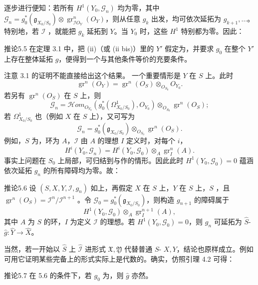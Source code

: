 逐步进行便知：若所有 $H^1(Y_0,\mathcal G_n)$ 均为零，其中 $\mathcal G_n=g_0^*(\mathfrak g_{X_0/S_0})\otimes\operatorname{gr}^n_{\mathcal I O_Y}(O_Y)$，则从任意 $g_k$ 出发，均可依次延拓为 $g_{k+1},\ldots$。特别地，若 $\mathcal I$ ，就能把 $g_k$ 延拓到 $Y$。当 $Y_0$ 时，这些 $H^1$ 特别都为零。因此：
\begin{SGAresult}{推论}{5.5}
在定理 3.1 中，把 (ii)（或 (ii bis)）里的 $Y'$ 假定为，并要求 $g_0$ 在整个 $Y'$ 上存在整体延拓 $g$，便得到一个与其他条件等价的充要条件。
\end{SGAresult}
注意 3.1 的证明不能直接给出这个结果。
一个重要情形是 $Y$ 在 $S$ 上。此时
\[\operatorname{gr}^n(O_Y)=\operatorname{gr}^n(O_S)\otimes_{O_{S_0}}O_{Y_0}.\]
若另有 $\operatorname{gr}^n(O_S)$ 在 $S$ 上，则
\[\mathcal G_n=\mathcal H\!om_{O_{Y_0}}(g_0^*(\Omega^1_{X_0/S_0}),O_{Y_0})\otimes_{O_{S_0}}\operatorname{gr}^n(O_S);\]
若 $\Omega^1_{X_0/S_0}$ 也（例如 $X$ 在 $S$ 上），又可写为
\[\mathcal G_n=g_0^*(\mathfrak g_{X_0/S_0})\otimes_{O_{S_0}}\operatorname{gr}^n(O_S).\]
例如，$S$ 为，环为 $A$，$\mathcal I$ 由 $A$ 的理想 $I$ 定义时，对每个 $i$，
\[H^i(Y_0,\mathcal G_n)=H^i(Y_0,\mathcal G_0)\otimes_A\operatorname{gr}^n_I(A).\]
事实上问题在 $S_0$ 上局部，可归结到与作的情形。因此此时 $H^1(Y_0,\mathcal G_0)=0$ 蕴涵依次延拓 $g_n$ 的所有障碍均为零。故：
\begin{SGAresult}{推论}{5.6}
设 $(S,X,Y,\mathcal I,g_n)$ 如上，再假定 $X$ 在 $S$ 上，$Y$ 在 $S$ 上，$S$ ，且 $\operatorname{gr}^n(O_S)=\mathcal I^n/\mathcal I^{n+1}$ 。令 $\mathcal G_0=g_0^*(\mathfrak g_{X_0/S_0})$，则构造 $g_{n+1}$ 的障碍属于
\[H^1(Y_0,\mathcal G_0)\otimes_A\operatorname{gr}^{n+1}_I(A),\]
其中 $A$ 为 $S$ 的环，$I$ 为定义 $\mathcal I$ 的理想。若 $H^1(Y_0,\mathcal G_0)=0$，则 $g_n$ 可延拓为 $\widehat S$- $\widehat g:\widehat Y\to\widehat X$。
\end{SGAresult}
当然，若一开始以 $\widehat S$ 上 $\widehat{\mathcal I}$ 进形式 $\mathfrak X,\mathfrak Y$ 代替普通 $S$- $X,Y$，结论也原样成立。例如可用它证明某些完备上的形式实际上是代数的。确实，仿照引理 4.2 可得：
\begin{SGAresult}{推论}{5.7}
在 5.6 的条件下，若 $g_0$ 为，则 $\widehat g$ 亦然。
\end{SGAresult}

